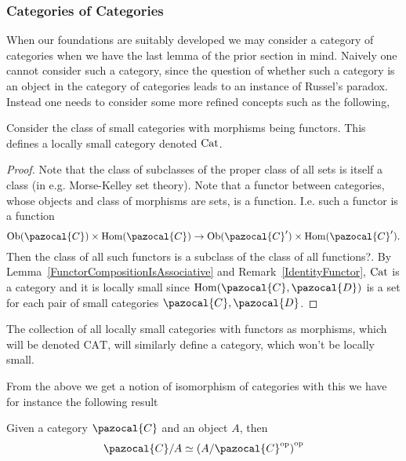\subsubsection{Categories of Categories}
When our foundations are suitably developed we may consider a category of categories when we have the last lemma of the prior section in mind. Naively one cannot consider such a category, since the question of whether such a category is an object in the category of categories leads to an instance of Russel's paradox. Instead one needs to consider some more refined concepts such as the following, 
\begin{proposition}
    Consider the class of small categories with morphisms being functors. This defines a locally small category denoted $\mathrm{Cat}$. 
\end{proposition}
\begin{proof}
    Note that the class of subclasses of the proper class of all sets is itself a class (in e.g. Morse-Kelley set theory). Note that a functor between categories, whose objects and class of morphisms are sets, is a function. I.e. such a functor 
    is a function 
    $$\Ob(\pazocal{C})\times \Hom(\pazocal{C}) \rightarrow \Ob(\pazocal{C}')\times \Hom(\pazocal{C}').$$
    Then the class of all such functors is a subclass of the class of all functions{\Large ?}. By Lemma~\ref{FunctorCompositionIsAssociative} and Remark~\ref{IdentityFunctor}, $\mathrm{Cat}$ is a category and it is locally small since $\Hom(\pazocal{C},\pazocal{D})$ is a set for each pair of small categories $\pazocal{C},\pazocal{D}$. 
\end{proof}
\begin{remark}
    The collection of all locally small categories with functors as morphisms, which will be denoted $\mathrm{CAT}$, will similarly define a category, which won't be locally small.  
\end{remark}
From the above we get a notion of isomorphism of categories with this we have for instance the following result
\begin{proposition}
    Given a category $\pazocal{C}$ and an object $A$, then 
    $$\pazocal{C}/A \simeq \left(A/\pazocal{C}\op\right)\op$$
\end{proposition}
